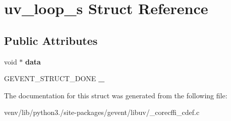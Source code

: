 \hypertarget{structuv__loop__s}{}\section{uv\+\_\+loop\+\_\+s Struct Reference}
\label{structuv__loop__s}
\subsection*{Public Attributes}
\begin{DoxyCompactItemize}
\item 
\mbox{\label{structuv__loop__s_aaeef0f8d2c764e9919504f76cdc13df1}} 
void $\ast$ {\bfseries data}
\item 
\mbox{\label{structuv__loop__s_a5007033d76fe5e15db7c25dfc63ce42d}} 
G\+E\+V\+E\+N\+T\+\_\+\+S\+T\+R\+U\+C\+T\+\_\+\+D\+O\+NE {\bfseries \+\_\+}
\end{DoxyCompactItemize}


The documentation for this struct was generated from the following file\+:\begin{DoxyCompactItemize}
\item 
venv/lib/python3./site-\/packages/gevent/libuv/\+\_\+corecffi\+\_\+cdef.\+c\end{DoxyCompactItemize}
